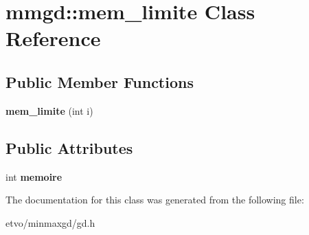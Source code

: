\hypertarget{classmmgd_1_1mem__limite}{}\section{mmgd\+:\+:mem\+\_\+limite Class Reference}
\label{classmmgd_1_1mem__limite}
\subsection*{Public Member Functions}
\begin{DoxyCompactItemize}
\item 
\mbox{\label{classmmgd_1_1mem__limite_ab00a238d0429a5bf079c4534db8b912c}} 
{\bfseries mem\+\_\+limite} (int i)
\end{DoxyCompactItemize}
\subsection*{Public Attributes}
\begin{DoxyCompactItemize}
\item 
\mbox{\label{classmmgd_1_1mem__limite_ade5cb5c82021ac0faaf831ab83ece8ae}} 
int {\bfseries memoire}
\end{DoxyCompactItemize}


The documentation for this class was generated from the following file\+:\begin{DoxyCompactItemize}
\item 
etvo/minmaxgd/gd.\+h\end{DoxyCompactItemize}
